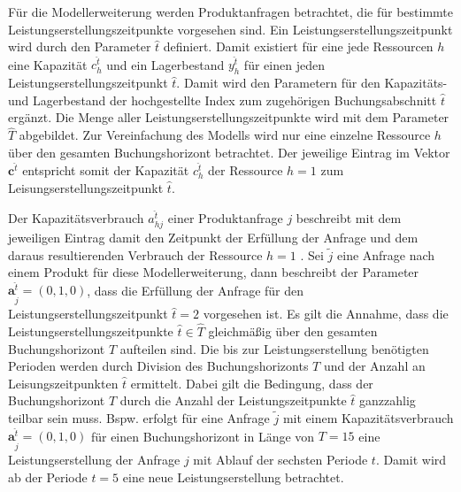 Für die Modellerweiterung werden Produktanfragen betrachtet, die für bestimmte Leistungserstellungszeitpunkte vorgesehen sind. Ein Leistungserstellungszeitpunkt wird durch den Parameter $\hat{t}$ definiert. Damit existiert für eine jede Ressourcen $h$ eine Kapazität $c_h^{\hat t}$ und ein Lagerbestand $y_h^{\hat t}$ für einen jeden Leistungserstellungszeitpunkt $\hat{t}$. Damit wird den Parametern für den Kapazitäts- und Lagerbestand der hochgestellte Index zum zugehörigen Buchungsabschnitt $\hat{t}$ ergänzt. Die Menge aller Leistungserstellungszeitpunkte wird mit dem Parameter $\hat T$ abgebildet. Zur Vereinfachung des Modells wird nur eine einzelne Ressource $h$ über den gesamten Buchungshorizont betrachtet. Der jeweilige Eintrag im Vektor $\textbf{c}^{\hat t}$ entspricht somit der Kapazität $c_h^{\hat t}$ der Ressource $h=1$ zum Leisungserstellungszeitpunkt $\hat{t}$.

Der Kapazitätsverbrauch $a_{hj}^{\hat t}$ einer Produktanfrage $j$ beschreibt mit dem jeweiligen Eintrag damit den Zeitpunkt der Erfüllung der Anfrage und dem daraus resultierenden Verbrauch der Ressource $h=1$ . Sei $\tilde{j}$ eine Anfrage nach einem Produkt für diese Modellerweiterung, dann beschreibt der Parameter $\textbf{a}_{\tilde{j}}^{\hat t}=(0,1,0)$, dass die Erfüllung der Anfrage für den Leistungserstellungszeitpunkt $\hat{t}=2$ vorgesehen ist. Es gilt die Annahme, dass die Leistungserstellungszeitpunkte $\hat t\in \hat T$ gleichmäßig über den gesamten Buchungshorizont $T$ aufteilen sind. Die bis zur Leistungserstellung benötigten Perioden werden durch Division des Buchungshorizonts $T$ und der Anzahl an Leisungszeitpunkten $\hat t$ ermittelt. Dabei gilt die Bedingung, dass der Buchungshorizont $T$ durch die Anzahl der Leistungszeitpunkte $\hat t$ ganzzahlig teilbar sein muss. Bspw. erfolgt für eine Anfrage $\tilde j$ mit einem Kapazitätsverbrauch $\textbf{a}^{\hat t}_{\tilde{j}}=(0,1,0)$ für einen Buchungshorizont in Länge von $T=15$ eine Leistungserstellung der Anfrage $j$ mit Ablauf der sechsten Periode $t$. Damit wird ab der Periode $t=5$ eine neue Leistungserstellung betrachtet.

